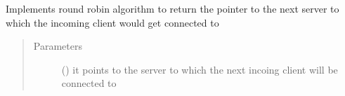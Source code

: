 \documentclass[letterpaper,10pt,english]{sphinxmanual}
\begin{document}

\begin{fulllineitems}
\label{\detokenize{loadbalancer:loadbalancer.round_robin}}
\sphinxAtStartPar
Implements round robin algorithm to return the pointer to the next server to which the incoming client would get connected to
\begin{quote}\begin{description}
\item[{Parameters}] \leavevmode
\sphinxAtStartPar
{} () \textendash{} it points to the server to which the next incoing client will be connected to

\end{description}\end{quote}

\end{fulllineitems}

\end{document}
